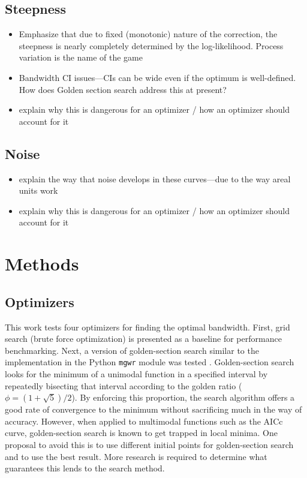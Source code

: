 \documentclass[letterpaper,12pt,twocolumn]{article}
\begin{document}
\subsection{Steepness}
\begin{itemize}
    \item Emphasize that due to fixed (monotonic) nature of the correction, the steepness is nearly completely determined by the log-likelihood. Process variation is the name of the game
    \item Bandwidth CI issues---CIs can be wide even if the optimum is well-defined. How does Golden section search address this at present?
    \item explain why this is dangerous for an optimizer / how an optimizer should account for it   
\end{itemize}

\subsection{Noise}
\begin{itemize}
    \item explain the way that noise develops in these curves---due to the way areal units work
    \item explain why this is dangerous for an optimizer / how an optimizer should account for it
\end{itemize}

\section{Methods}
\label{sec:methods}
\subsection{Optimizers}
This work tests four optimizers for finding the optimal bandwidth. First, grid search (brute force optimization) is presented as a baseline for performance benchmarking. Next, a version of golden-section search \cite{Kiefer1953} similar to the implementation in the Python \texttt{mgwr} module was tested \cite{Oshan2019}. Golden-section search looks for the minimum of a unimodal function in a specified interval by repeatedly bisecting that interval according to the golden ratio ($\phi = (1 + \sqrt{5})/2$). By enforcing this proportion, the search algorithm offers a good rate of convergence to the minimum without sacrificing much in the way of accuracy. However, when applied to multimodal functions such as the AICc curve, golden-section search is known to get trapped in local minima. One proposal to avoid this is to use different initial points for golden-section search and to use the best result. More research is required to determine what guarantees this lends to the search method.
\end{document}
